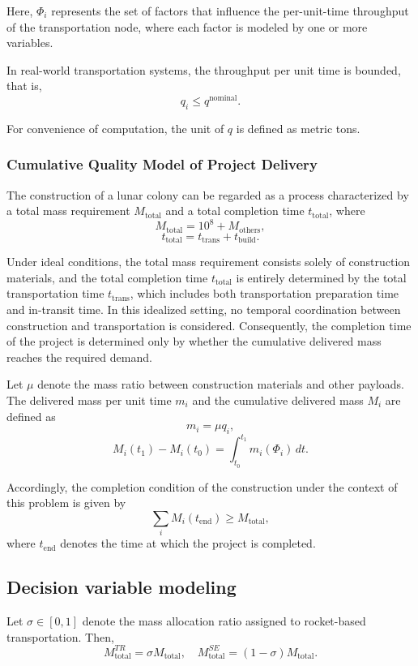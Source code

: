 \documentclass[12pt]{article}
\begin{document}
Here, $\Phi_i$ represents the set of factors that influence the per-unit-time throughput of the transportation node, where each factor is modeled by one or more variables.

In real-world transportation systems, the throughput per unit time is bounded, that is,
\[
q_i \le q^{\text{nominal}} .
\]

For convenience of computation, the unit of $q$ is defined as metric tons.

\subsubsection{Cumulative Quality Model of Project Delivery}
The construction of a lunar colony can be regarded as a process characterized by a total mass requirement $M_{\text{total}}$ and a total completion time $t_{\text{total}}$, where
\[
M_{\text{total}} = 10^8 + M_{\text{others}} ,
\]
\[
t_{\text{total}} = t_{\text{trans}} + t_{\text{build}} .
\]

Under ideal conditions, the total mass requirement consists solely of construction materials, and the total completion time $t_{\text{total}}$ is entirely determined by the total transportation time $t_{\text{trans}}$, which includes both transportation preparation time and in-transit time. In this idealized setting, no temporal coordination between construction and transportation is considered. Consequently, the completion time of the project is determined only by whether the cumulative delivered mass reaches the required demand.

Let $\mu$ denote the mass ratio between construction materials and other payloads. The delivered mass per unit time $m_i$ and the cumulative delivered mass $M_i$ are defined as
\[
m_i = \mu q_i ,
\]
\[
M_i(t_1) - M_i(t_0) = \int_{t_0}^{t_1} m_i(\Phi_i)\, dt .
\]

Accordingly, the completion condition of the construction under the context of this problem is given by
\[
\sum_i M_i(t_{\text{end}}) \ge M_{\text{total}} ,
\]
where $t_{\text{end}}$ denotes the time at which the project is completed.

\subsection{Decision variable modeling}

Let $\sigma \in [0,1]$ denote the mass allocation ratio assigned to rocket-based transportation. Then,
\[
M_{\text{total}}^{TR} = \sigma M_{\text{total}} , \quad M_{\text{total}}^{SE} = (1 - \sigma) M_{\text{total}} .
\]
\end{document}

